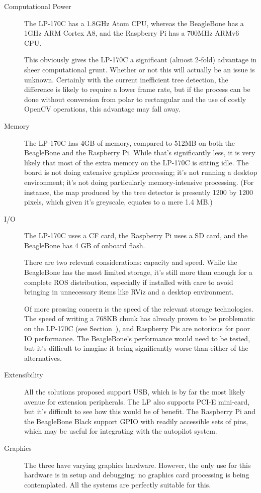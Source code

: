 \documentclass[12pt,oneside,a4paper]{book}
\begin{document}
\begin{description}
\item[Computational Power] The LP-170C has a 1.8GHz Atom CPU, whereas
  the BeagleBone has a 1GHz ARM Cortex A8, and the Raspberry Pi has a
  700MHz ARMv6 CPU.

  This obviously gives the LP-170C a significant (almost 2-fold)
  advantage in sheer computational grunt. Whether or not this will
  actually be an issue is unknown. Certainly with the current
  inefficient tree detection, the difference is likely to require a
  lower frame rate, but if the process can be done without conversion
  from polar to rectangular and the use of costly OpenCV operations,
  this advantage may fall away.
\item[Memory] The LP-170C has 4GB of memory, compared to 512MB on both
  the BeagleBone and the Raspberry Pi. While that's significantly
  less, it is very likely that most of the extra memory on the LP-170C is sitting
  idle. The board is not doing extensive graphics processing; it's not
  running a desktop environment; it's not doing particularly
  memory-intensive processing. (For instance, the map produced by the
  tree detector is presently 1200 by 1200 pixels, which given it's
  greyscale, equates to a mere 1.4 MB.)
\item[I/O] The LP-170C uses a CF card, the Raspberry Pi uses a SD
  card, and the BeagleBone has 4 GB of onboard flash.

  There are two relevant considerations: capacity and speed. While the
  BeagleBone has the most limited storage, it's still more than enough
  for a complete ROS distribution, especially if installed with care
  to avoid bringing in unnecessary items like RViz and a desktop
  environment.

  Of more pressing concern is the speed of the relevant storage
  technologies. The speed of writing a 768KB chunk has already proven
  to be problematic on the LP-170C (see Section~), and
  Raspberry Pis are notorious for poor IO performance. The
  BeagleBone's performance would need to be tested, but it's
  difficult to imagine it being significantly worse than either of the
  alternatives.
\item[Extensibility] All the solutions proposed support USB, which is
  by far the most likely avenue for extension peripherals. The LP also
  supports PCI-E mini-card, but it's difficult to see how this would
  be of benefit. The Raspberry Pi and the BeagleBone Black support
  GPIO with readily accessible sets of pins, which may be useful for
  integrating with the autopilot system.
\item[Graphics] The three have varying graphics hardware. However, the
  only use for this hardware is in setup and debugging: no graphics
  card processing is being contemplated. All the systems are perfectly
  suitable for this.
\end{description}
\end{document}
